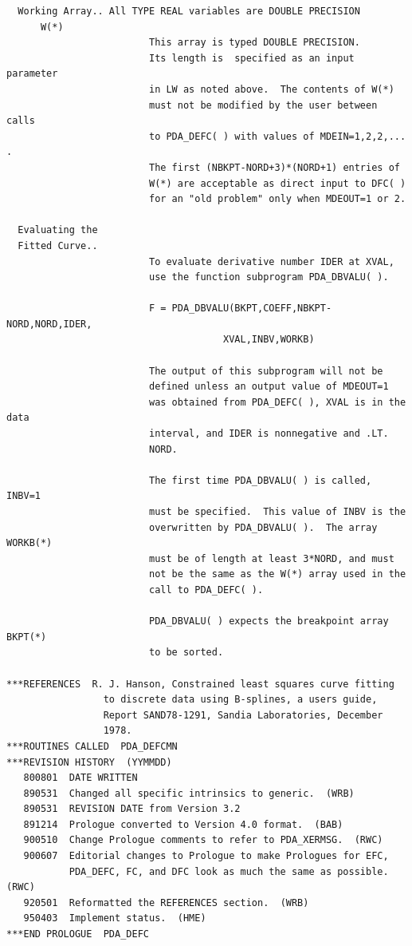 \documentclass[11pt,twoside]{article}
\begin{document}
\begin{verbatim}
  Working Array.. All TYPE REAL variables are DOUBLE PRECISION
      W(*)
                         This array is typed DOUBLE PRECISION.
                         Its length is  specified as an input parameter
                         in LW as noted above.  The contents of W(*)
                         must not be modified by the user between calls
                         to PDA_DEFC( ) with values of MDEIN=1,2,2,... .
                         The first (NBKPT-NORD+3)*(NORD+1) entries of
                         W(*) are acceptable as direct input to DFC( )
                         for an "old problem" only when MDEOUT=1 or 2.

  Evaluating the
  Fitted Curve..
                         To evaluate derivative number IDER at XVAL,
                         use the function subprogram PDA_DBVALU( ).

                         F = PDA_DBVALU(BKPT,COEFF,NBKPT-NORD,NORD,IDER,
                                      XVAL,INBV,WORKB)

                         The output of this subprogram will not be
                         defined unless an output value of MDEOUT=1
                         was obtained from PDA_DEFC( ), XVAL is in the data
                         interval, and IDER is nonnegative and .LT.
                         NORD.

                         The first time PDA_DBVALU( ) is called, INBV=1
                         must be specified.  This value of INBV is the
                         overwritten by PDA_DBVALU( ).  The array WORKB(*)
                         must be of length at least 3*NORD, and must
                         not be the same as the W(*) array used in the
                         call to PDA_DEFC( ).

                         PDA_DBVALU( ) expects the breakpoint array BKPT(*)
                         to be sorted.

***REFERENCES  R. J. Hanson, Constrained least squares curve fitting
                 to discrete data using B-splines, a users guide,
                 Report SAND78-1291, Sandia Laboratories, December
                 1978.
***ROUTINES CALLED  PDA_DEFCMN
***REVISION HISTORY  (YYMMDD)
   800801  DATE WRITTEN
   890531  Changed all specific intrinsics to generic.  (WRB)
   890531  REVISION DATE from Version 3.2
   891214  Prologue converted to Version 4.0 format.  (BAB)
   900510  Change Prologue comments to refer to PDA_XERMSG.  (RWC)
   900607  Editorial changes to Prologue to make Prologues for EFC,
           PDA_DEFC, FC, and DFC look as much the same as possible.  (RWC)
   920501  Reformatted the REFERENCES section.  (WRB)
   950403  Implement status.  (HME)
***END PROLOGUE  PDA_DEFC
\end{verbatim}
\end{document}
